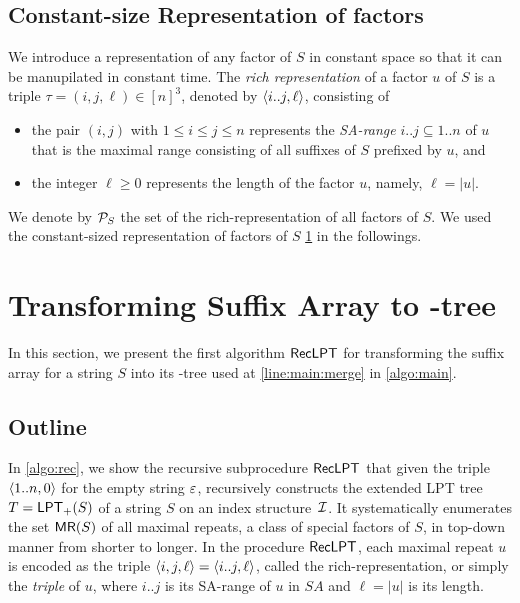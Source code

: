\documentclass{article}
\begin{document}
\subsection{Constant-size Representation of factors}
\label{sec:constant:size:rep}
We introduce a representation of any factor of $S$ in constant space so that it can be manupilated in constant time. 
The \textit{rich representation} of a factor $u$ of $S$ is a triple $\tau = (i, j, \ell) \in [n]^3$, denoted by $\langle i..j, \ell\rangle$, consisting of 
\begin{itemize}
\item the pair $(i, j)$ with $1\le i\le j\le n$ represents the \textit{SA-range} $i..j\subseteq 1..n$ of $u$ that is the maximal range
  consisting of all suffixes of $S$ prefixed by $u$, and  
  
\item the integer $\ell\ge 0$ represents the length of the factor $u$, namely, $\ell = |u|$. 
\end{itemize}

We denote by $\mathcal{P}_{S}$ the set of the rich-representation of all factors of $S$.
We used the constant-sized representation of factors of $S$ \cref{sec:sa:to:lpt} in the followings. 


\section{Transforming Suffix Array to \LPTrm-tree}
\label{sec:sa:to:lpt}

In this section, we present the first algorithm $\textsf{RecLPT}$ for transforming the suffix array for a string $S$ into its \LPTrm-tree used at \cref{line:main:merge} in \cref{algo:main}.


\subsection{Outline}
In \cref{algo:rec}, we show the recursive subprocedure $\textsf{RecLPT}$ that given the triple $\langle 1..n, 0\rangle$ for the empty string $\varepsilon$, recursively constructs the extended LPT tree $T = \mathsf{LPT}_{+}(S)$ of a string $S$ on an index structure~$\mathcal{I}$. It systematically enumerates the set $\textsf{MR}(S)$ of all maximal repeats, a class of special factors of $S$, in top-down manner from shorter to longer. In the procedure $\textsf{RecLPT}$, each maximal repeat $u$ is encoded as the triple $\langle i, j, \ell\rangle = \langle i..j, \ell\rangle$, called the rich-representation, or simply the \textit{triple} of $u$, where $i..j$ is its SA-range of $u$ in $SA$ and $\ell = |u|$ is its length.
\end{document}

